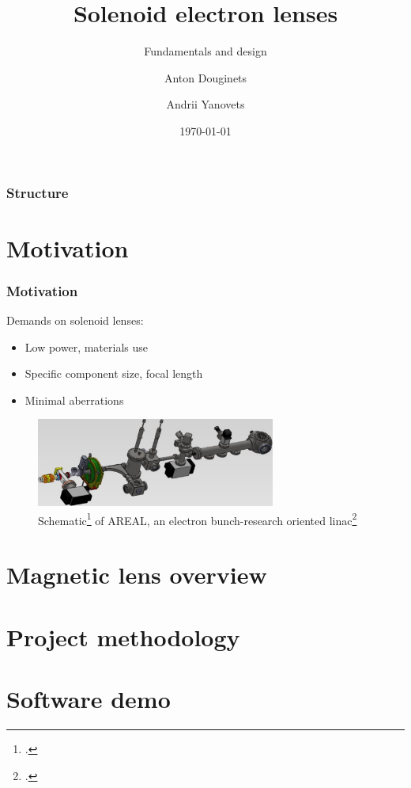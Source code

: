 \documentclass[10pt]{beamer}
\title{Solenoid electron lenses}
\subtitle{Fundamentals and design}
\author{Anton Douginets \and Andrii Yanovets}
\date{\today}
\newcommand{\rfn}{\setcounter{footnote}{0}}
\begin{document}
\begin{frame}[plain]
  \titlepage
\end{frame}

\begin{frame}
  \frametitle{Structure}
  \tableofcontents%
\end{frame}

\section{Motivation}

\begin{frame}
  \frametitle{Motivation}
  \rfn
  Demands on solenoid lenses:
  \begin{itemize}
    \item Low power, materials use
    \item Specific component size, focal length
    \item Minimal aberrations
  \end{itemize}
  \vspace{0.5cm}
  \begin{figure}
  \centering
    \includegraphics[width=0.7\textwidth]{AREAL}
    \caption{Schematic\footcite{AREALRF} of AREAL, an electron bunch-research oriented linac\footcite{AREAL}}

  \end{figure}
\end{frame}


\section{Magnetic lens overview}


\section{Project methodology}



\section{Software demo}

\end{document}
